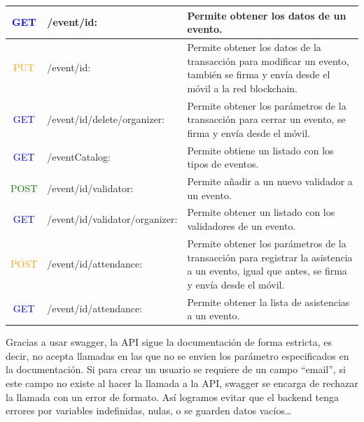 \begin{center}
\begin{tabular}{|c|l|m{23em}|}
    \hline
    \textcolor{blue}{{\footnotesize GET}} & /event/{id}: & Permite obtener los datos de un evento. \\
    \hline
    \textcolor{orange}{{\footnotesize PUT}} & /event/{id}: & Permite obtener los datos de la transacción para modificar un evento, también se firma y envía desde el móvil a la red blockchain.  \\
    \hline
    \textcolor{blue}{{\footnotesize GET}} & /event/{id}/delete/{organizer}: & Permite obtener los parámetros de la transacción para cerrar un evento, se firma y envía desde el móvil. \\
    \hline
    \textcolor{blue}{{\footnotesize GET}} & /eventCatalog: & Permite obtiene un listado con los tipos de eventos.  \\
    \hline
    \textcolor{green}{{\footnotesize POST}} & /event/{id}/validator: & Permite añadir a un nuevo validador a un evento. \\
    \hline
    \textcolor{blue}{{\footnotesize GET}} & /event/{id}/validator/{organizer}: & Permite obtener un listado con los validadores de un evento.  \\
    \hline
    \textcolor{orange}{{\footnotesize POST}} & /event/{id}/attendance: & Permite obtener los parámetros de la transacción para registrar la asistencia a un evento, igual que antes, se firma y envía desde el móvil.  \\
    \hline
    \textcolor{blue}{{\footnotesize GET}} & /event/{id}/attendance: & Permite obtener la lista de asistencias a un evento.  \\
    \hline
  \end{tabular}
\end{center}

Gracias a usar swagger, la API sigue la documentación de forma estricta, es decir, no acepta llamadas en las que no se envien los parámetro especificados en la documentación. Si para crear un usuario se requiere de un campo ``email'', si este campo no existe al hacer la llamada a la API, swagger se encarga de rechazar la llamada con un error de formato. Así logramos evitar que el backend tenga errores por variables indefinidas, nulas, o se guarden datos vacíos\dots

